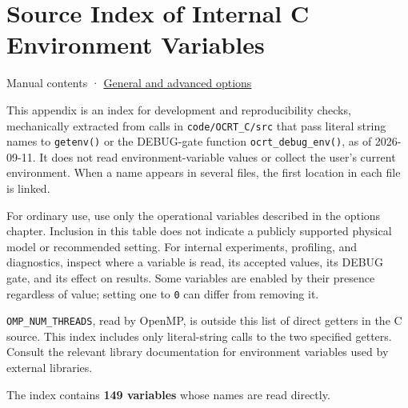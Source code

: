 \chapter{Source Index of Internal C Environment Variables}
\label{chap:03_environment_index}
Manual contents · \hyperref[chap:03_options]{General and advanced options}

This appendix is an index for development and reproducibility checks, mechanically extracted from calls in \texttt{code/\allowbreak{}OCRT\_\allowbreak{}C/\allowbreak{}src} that pass literal string names to \texttt{getenv()} or the DEBUG-gate function \texttt{ocrt\_\allowbreak{}debug\_\allowbreak{}env()}, as of 2026-09-11. It does not read environment-variable values or collect the user's current environment. When a name appears in several files, the first location in each file is linked.

For ordinary use, use only the operational variables described in the options chapter. Inclusion in this table does not indicate a publicly supported physical model or recommended setting. For internal experiments, profiling, and diagnostics, inspect where a variable is read, its accepted values, its DEBUG gate, and its effect on results. Some variables are enabled by their presence regardless of value; setting one to \texttt{0} can differ from removing it.

\texttt{OMP\_\allowbreak{}NUM\_\allowbreak{}THREADS}, read by OpenMP, is outside this list of direct getters in the C source. This index includes only literal-string calls to the two specified getters. Consult the relevant library documentation for environment variables used by external libraries.

The index contains \textbf{149 variables} whose names are read directly.


